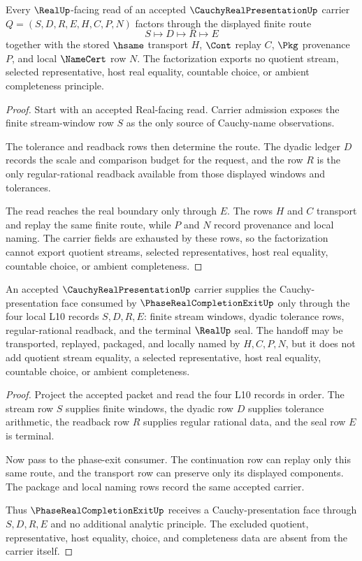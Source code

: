 \begin{theorem}
\label{thm:cauchy-real-presentation-real-seal-factorization}
Every $\RealUp$-facing read of an accepted $\CauchyRealPresentationUp$ carrier $Q=(S,D,R,E,H,C,P,N)$ factors through the displayed finite route
$$
S \longmapsto D \longmapsto R \longmapsto E
$$
together with the stored $\hsame$ transport $H$, $\Cont$ replay $C$, $\Pkg$ provenance $P$, and local $\NameCert$ row $N$. The factorization exports no quotient stream, selected representative, host real equality, countable choice, or ambient completeness principle.
\end{theorem}
\begin{proof}
Start with an accepted Real-facing read. Carrier admission exposes the finite stream-window row $S$ as the only source of Cauchy-name observations.

The tolerance and readback rows then determine the route. The dyadic ledger $D$ records the scale and comparison budget for the request, and the row $R$ is the only regular-rational readback available from those displayed windows and tolerances.

The read reaches the real boundary only through $E$. The rows $H$ and $C$ transport and replay the same finite route, while $P$ and $N$ record provenance and local naming. The carrier fields are exhausted by these rows, so the factorization cannot export quotient streams, selected representatives, host real equality, countable choice, or ambient completeness.
\end{proof}

\begin{theorem}
\label{thm:cauchy-real-presentation-phase-exit-handoff}
An accepted $\CauchyRealPresentationUp$ carrier supplies the Cauchy-presentation face consumed by $\PhaseRealCompletionExitUp$ only through the four local L10 records $S,D,R,E$: finite stream windows, dyadic tolerance rows, regular-rational readback, and the terminal $\RealUp$ seal. The handoff may be transported, replayed, packaged, and locally named by $H,C,P,N$, but it does not add quotient stream equality, a selected representative, host real equality, countable choice, or ambient completeness.
\end{theorem}
\begin{proof}
Project the accepted packet and read the four L10 records in order. The stream row $S$ supplies finite windows, the dyadic row $D$ supplies tolerance arithmetic, the readback row $R$ supplies regular rational data, and the seal row $E$ is terminal.

Now pass to the phase-exit consumer. The continuation row can replay only this same route, and the transport row can preserve only its displayed components. The package and local naming rows record the same accepted carrier.

Thus $\PhaseRealCompletionExitUp$ receives a Cauchy-presentation face through $S,D,R,E$ and no additional analytic principle. The excluded quotient, representative, host equality, choice, and completeness data are absent from the carrier itself.
\end{proof}

